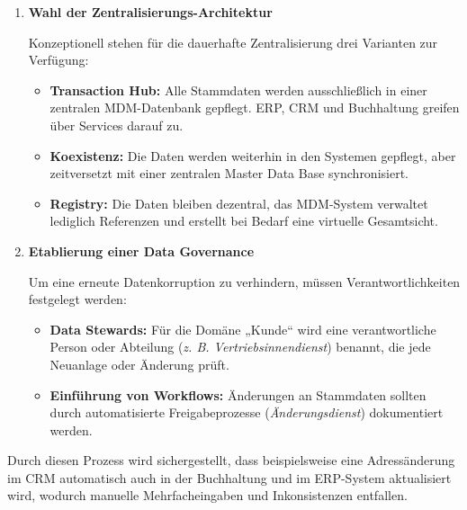 \begin{enumerate}[label=\arabic*.), leftmargin=*]
\begin{itemize}
    \end{itemize}
    \item \textbf{Wahl der Zentralisierungs-Architektur} \par Konzeptionell stehen für die dauerhafte Zentralisierung drei Varianten zur Verfügung: \cite{101}
    \begin{itemize}
        \item \textbf{Transaction Hub:} Alle Stammdaten werden ausschließlich in einer zentralen \acs{MDM}-Datenbank gepflegt. \acs{ERP}, \acs{CRM} und Buchhaltung greifen über Services darauf zu. \cite{101}
        \item \textbf{Koexistenz:} Die Daten werden weiterhin in den Systemen gepflegt, aber zeitversetzt mit einer zentralen Master Data Base synchronisiert. \cite{101}
        \item \textbf{Registry:} Die Daten bleiben dezentral, das \acs{MDM}-System verwaltet lediglich Referenzen und erstellt bei Bedarf eine virtuelle Gesamtsicht. \cite{101}
    \end{itemize}
    \item \textbf{Etablierung einer Data Governance} \par Um eine erneute Datenkorruption zu verhindern, müssen Verantwortlichkeiten festgelegt werden:
    \begin{itemize}
        \item \textbf{Data Stewards:} Für die Domäne „Kunde“ wird eine verantwortliche Person oder Abteilung (\textit{\acs{z. B.} Vertriebsinnendienst}) benannt, die jede Neuanlage oder Änderung prüft. \cite{105}
        \item \textbf{Einführung von Workflows:} Änderungen an Stammdaten sollten durch automatisierte Freigabeprozesse (\textit{Änderungsdienst}) dokumentiert werden. \cite{106}
    \end{itemize}
\end{enumerate}
Durch diesen Prozess wird sichergestellt, dass beispielsweise eine Adressänderung im \acs{CRM} automatisch auch in der Buchhaltung und im \acs{ERP}-System aktualisiert wird, wodurch manuelle Mehrfacheingaben und Inkonsistenzen entfallen. \cite{107}\cite{108}

